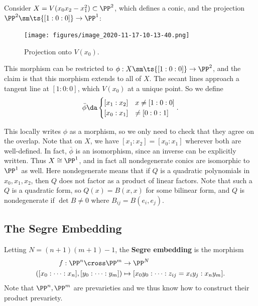 \begin{example}[?]

Consider \(X = V(x_0 x_2 - x_1^2) \subset \PP^2\), which defines a
conic, and the projection \(\PP^2 \sm \ts{[1:0:0]} \to \PP^1\):

\begin{figure}
\centering
\texttt{[image: figures/image\_2020-11-17-10-13-40.png]}
\caption{Projection onto \(V(x_0)\).}
\end{figure}

This morphism can be restricted to \(\phi: X\sm\ts{[1:0:0]} \to \PP^2\),
and the claim is that this morphism extends to all of \(X\). The secant
lines approach a tangent line at \([1:0:0]\), which \(V(x_0)\) at a
unique point. So we define
\begin{align*}  
\bar \phi \da 
\begin{cases}
[x_1: x_2] & x \neq [1:0:0] \\
[x_0: x_1] & \neq [0:0:1]
\end{cases}
.\end{align*}

This locally writes \(\phi\) as a morphism, so we only need to check
that they agree on the overlap. Note that on \(X\), we have
\([x_1: x_2] = [x_0 : x_1]\) wherever both are well-defined. In fact,
\(\bar \phi\) is an isomorphism, since an inverse can be explicitly
written. Thus \(X\cong \PP^1\), and in fact all nondegenerate conics are
isomorphic to \(\PP^1\) as well. Here nondegenerate means that if \(Q\)
is a quadratic polynomials in \(x_0, x_1, x_2\), then \(Q\) does not
factor as a product of linear factors. Note that such a \(Q\) is a
quadratic form, so \(Q(x) = B(x, x)\) for some bilinear form, and \(Q\)
is nondegenerate if \(\det B \neq 0\) where \(B_{ij} = B(e_i, e_j)\).

\end{example}

\hypertarget{the-segre-embedding}{%
\subsection{The Segre Embedding}\label{the-segre-embedding}}

\begin{definition}[?]

Letting \(N = (n+1)(m+1) - 1\), the \textbf{Segre embedding} is the
morphism
\begin{align*}  
f: \PP^n \cross \PP^m &\to \PP^N \\
([x_0: \cdots : x_n], [y_0: \cdots : y_m]) &\mapsto
[x_0 y_0 : \cdots : z_{ij} = x_i y_j : x_n y_m]
.\end{align*} Note that \(\PP^n, \PP^m\) are prevarieties and we thus
know how to construct their product prevariety.

\end{definition}

